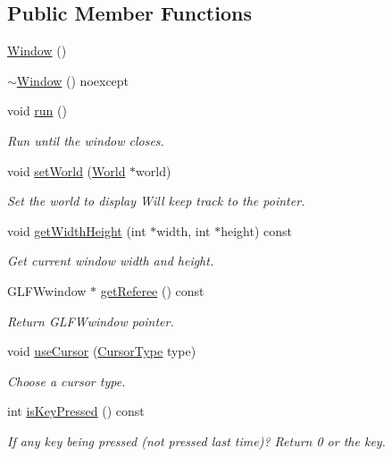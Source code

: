 \subsection*{Public Member Functions}
\begin{DoxyCompactItemize}
\item 
\hyperlink{classWindow_a74e6087da23d3c24e9fac0245e5ec92c}{Window} ()
\item 
\hyperlink{classWindow_ae6b4e3e731f32506a8ae77790b08584e}{$\sim$\+Window} () noexcept
\item 
void \hyperlink{classWindow_ae137ec42ddc87d666d49661484410091}{run} ()
\begin{DoxyCompactList}\small\item\em Run until the window closes. \end{DoxyCompactList}\item 
void \hyperlink{classWindow_a0038b02fa4141ac2684a62b0884ca776}{set\+World} (\hyperlink{classWorld}{World} $\ast$world)
\begin{DoxyCompactList}\small\item\em Set the world to display Will keep track to the pointer. \end{DoxyCompactList}\item 
void \hyperlink{classWindow_ab52aaa3a6e68b05684df07c54caa42b0}{get\+Width\+Height} (int $\ast$width, int $\ast$height) const 
\begin{DoxyCompactList}\small\item\em Get current window width and height. \end{DoxyCompactList}\item 
G\+L\+F\+Wwindow $\ast$ \hyperlink{classWindow_a98ef189d2c7ac79179669aa3ad4c2f2c}{get\+Referee} () const 
\begin{DoxyCompactList}\small\item\em Return G\+L\+F\+Wwindow pointer. \end{DoxyCompactList}\item 
void \hyperlink{classWindow_ae8a1d3d51a2546a07ca839a6d47298e6}{use\+Cursor} (\hyperlink{classWindow_a777c693a4c2b74e712839aa15189e07f}{Cursor\+Type} type)
\begin{DoxyCompactList}\small\item\em Choose a cursor type. \end{DoxyCompactList}\item 
int \hyperlink{classWindow_a81c38391a3e466507cadd7baea94e748}{is\+Key\+Pressed} () const 
\begin{DoxyCompactList}\small\item\em If any key being pressed (not pressed last time)? Return 0 or the key. \end{DoxyCompactList}\item 

\end{DoxyCompactItemize}
